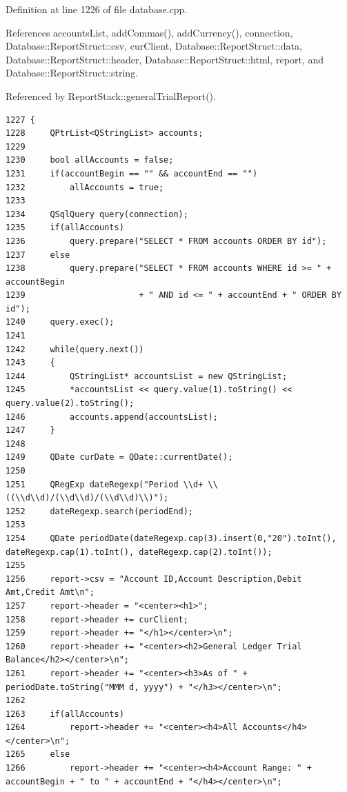 Definition at line 1226 of file database.cpp.

References accounts\-List, add\-Commas(), add\-Currency(), connection, Database::Report\-Struct::csv, cur\-Client, Database::Report\-Struct::data, Database::Report\-Struct::header, Database::Report\-Struct::html, report, and Database::Report\-Struct::string.

Referenced by Report\-Stack::general\-Trial\-Report().

\footnotesize\begin{verbatim}1227 {
1228     QPtrList<QStringList> accounts;
1229     
1230     bool allAccounts = false;
1231     if(accountBegin == "" && accountEnd == "")
1232         allAccounts = true;
1233    
1234     QSqlQuery query(connection);
1235     if(allAccounts)
1236         query.prepare("SELECT * FROM accounts ORDER BY id");
1237     else
1238         query.prepare("SELECT * FROM accounts WHERE id >= " + accountBegin
1239                       + " AND id <= " + accountEnd + " ORDER BY id");
1240     query.exec();
1241 
1242     while(query.next())
1243     {
1244         QStringList* accountsList = new QStringList;
1245         *accountsList << query.value(1).toString() << query.value(2).toString();
1246         accounts.append(accountsList);
1247     }
1248     
1249     QDate curDate = QDate::currentDate();
1250     
1251     QRegExp dateRegexp("Period \\d+ \\((\\d\\d)/(\\d\\d)/(\\d\\d)\\)");
1252     dateRegexp.search(periodEnd);
1253     
1254     QDate periodDate(dateRegexp.cap(3).insert(0,"20").toInt(), dateRegexp.cap(1).toInt(), dateRegexp.cap(2).toInt());
1255     
1256     report->csv = "Account ID,Account Description,Debit Amt,Credit Amt\n";
1257     report->header = "<center><h1>";
1258     report->header += curClient;
1259     report->header += "</h1></center>\n";
1260     report->header += "<center><h2>General Ledger Trial Balance</h2></center>\n";
1261     report->header += "<center><h3>As of " + periodDate.toString("MMM d, yyyy") + "</h3></center>\n";
1262     
1263     if(allAccounts)
1264         report->header += "<center><h4>All Accounts</h4></center>\n";
1265     else
1266         report->header += "<center><h4>Account Range: " + accountBegin + " to " + accountEnd + "</h4></center>\n";

\end{verbatim}
